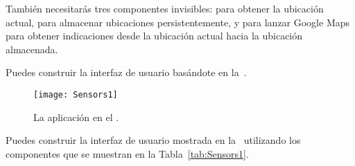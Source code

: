 También necesitarás tres componentes invisibles:
 para obtener la ubicación actual,
 para almacenar ubicaciones persistentemente, y
 para lanzar Google Maps para obtener
indicaciones desde la ubicación actual hacia la ubicación almacenada.

Puedes construir la interfaz de usuario basándote en
la~.

\begin{figure}[H]
\centering
\texttt{[image: Sensors1]}
\caption{La aplicación  en el \componentDesigner.}
\label{fig:Sensors1}
\end{figure}

Puedes construir la interfaz de usuario mostrada en
la~ utilizando los componentes que se muestran en
la Tabla~\ref{tab:Sensors1}.

